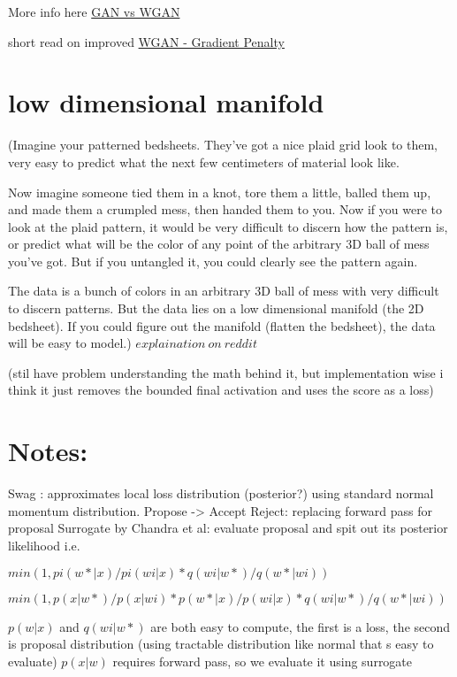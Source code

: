 \documentclass[honours,12pt]{unswthesis}
\numberwithin{equation}{section}
\begin{document}
More info here \href{https://lilianweng.github.io/lil-log/2017/08/20/from-GAN-to-WGAN.html}{GAN vs WGAN}

short read on improved \href{https://towardsdatascience.com/demystified-wasserstein-gan-with-gradient-penalty-ba5e9b905ead}{WGAN - Gradient Penalty}

\section{low dimensional manifold}
(Imagine your patterned bedsheets. They've got a nice plaid grid look to them, very easy to predict what the next few centimeters of material look like.

Now imagine someone tied them in a knot, tore them a little, balled them up, and made them a crumpled mess, then handed them to you. Now if you were to look at the plaid pattern, it would be very difficult to discern how the pattern is, or predict what will be the color of any point of the arbitrary 3D ball of mess you've got. But if you untangled it, you could clearly see the pattern again.

The data is a bunch of colors in an arbitrary 3D ball of mess with very difficult to discern patterns. But the data lies on a low dimensional manifold (the 2D bedsheet). If you could figure out the manifold (flatten the bedsheet), the data will be easy to model.)  $explaination\ on\ reddit$

(stil have problem understanding the math behind it, but implementation wise i think it just removes the bounded final activation and uses the score as a loss) 


\section{ Notes:}

Swag : approximates local loss distribution (posterior?) using standard normal momentum distribution.
Propose -> Accept Reject: replacing forward pass for proposal 
Surrogate by Chandra et al: evaluate proposal and spit out its posterior likelihood
    i.e. 
    
    $min(1, pi(w*|x)/pi(wi|x) *  q(wi|w*)/q(w*|wi) )$
    
    $min(1, p(x|w*)/p(x|wi) * p(w*|x)/p(wi|x) *  q(wi|w*)/q(w*|wi) )$

    $p(w|x)$ and $q(wi|w*)$ are both easy to compute, the first is a loss, the second is proposal distribution (using tractable distribution like normal that s easy to evaluate)    
    $p(x|w)$ requires forward pass, so we evaluate it using surrogate
\end{document}
